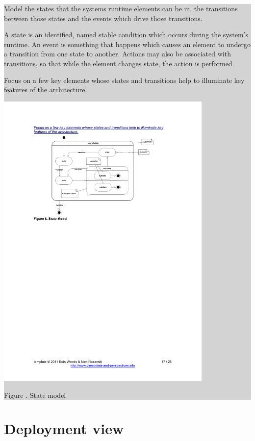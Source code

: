 \documentclass[a4paper,11pt]{report}
\newcommand{\instructions}[1]{
  \noindent\colorbox{lightgray}{%
    \parbox{\linewidth}{%
      #1
    }%
  }%
 \vspace{0.1cm}
}
\newcommand{\mycaption}[1]{
  \addtocounter{figures}{1}
  Figure \arabic{figures}. #1
}
\begin{document}
\instructions{
Model the states that the systems runtime elements can be in, the
transitions between those states and the events which drive those
transitions.

A state is an identified, named stable condition which occurs during
the system’s runtime. An event is something that happens which causes
an element to undergo a transition from one state to another. Actions
may also be associated with transitions, so that while the element
changes state, the action is performed.

Focus on a few key elements whose states and transitions help to illuminate
key features of the architecture.

\begin{center}
  \includegraphics[width=0.8\textwidth]{figures/statemodel}\\
  \mycaption{State model}
\end{center}

}

\section{Deployment view}
\label{sec:deployment-view}
\end{document}

